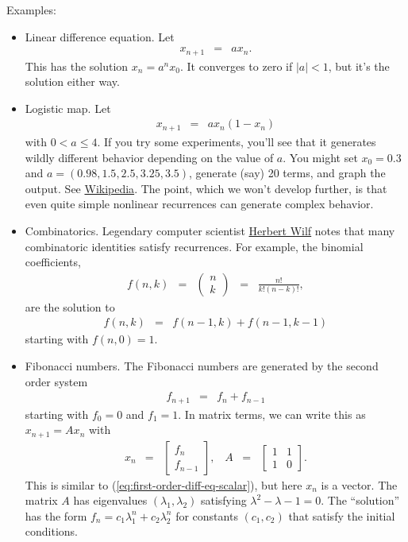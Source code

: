 \documentclass[11pt]{article}
\begin{document}
Examples:
\begin{itemize}
\item Linear difference equation.
Let
\begin{eqnarray}
    x_{n+1} &=& a x_n .
    \label{eq:first-order-diff-eq-scalar}
\end{eqnarray}
This has the solution $ x_n = a^n x_0$.
It converges to zero if $ |a | < 1 $, but it's the solution either way.

\item Logistic map.
Let
\begin{eqnarray*}
    x_{n+1} &=& a x_n (1-x_n)
\end{eqnarray*}
with $ 0 < a \leq 4$.
If you try some experiments, you'll see that it generates wildly
different behavior depending on the value of $a$.
You might set $x_0 = 0.3$ and $a = (0.98, 1.5, 2.5, 3.25, 3.5 )$,
generate (say) 20 terms, and graph the output.
See
\href{http://en.wikipedia.org/wiki/Logistic_map}{Wikipedia}.
The point, which we won't develop further, is that even
quite simple nonlinear recurrences can generate complex behavior.

\item Combinatorics.
Legendary computer scientist
\href{http://www.math.upenn.edu/~wilf/DownldGF.html}{Herbert Wilf}
notes that many combinatoric identities satisfy recurrences.
For example, the binomial coefficients,
\begin{eqnarray*}
    f(n,k) &=&  \left( \begin{array}{c} n \\ k \end{array}\right)
            \;\;=\;\;  \frac{n!}{k!(n-k)!} ,
\end{eqnarray*}
are the solution to
\begin{eqnarray*}
    f(n,k) &=&  f(n-1,k) + f(n-1,k-1)
\end{eqnarray*}
starting with $ f(n,0) = 1$.

\item Fibonacci numbers.
The Fibonacci numbers are generated by the second order system
\begin{eqnarray*}
    f_{n+1} &=& f_n + f_{n-1}
\end{eqnarray*}
starting with $f_0 = 0$ and $f_1 = 1$.
In matrix terms, we can write this as $ x_{n+1} = A x_n $ with
\begin{eqnarray*}
        x_n &=& \left[ \begin{array}{c} f_n \\ f_{n-1} \end{array}\right],
        \;\;\;
        A \;\;=\;\; \left[ \begin{array}{cc} 1 & 1  \\ 1 & 0 \end{array}\right] .
\end{eqnarray*}
This is similar to (\ref{eq:first-order-diff-eq-scalar}), but here $x_n$ is a vector.
The matrix $A$ has eigenvalues $(\lambda_1,\lambda_2)$ satisfying
$ \lambda^2 - \lambda - 1 = 0 $.
The ``solution'' has the form $ f_n = c_1 \lambda_1^n + c_2 \lambda_2^n $ for constants
$(c_1,c_2)$ that satisfy the initial conditions.


\end{itemize}
\end{document}
